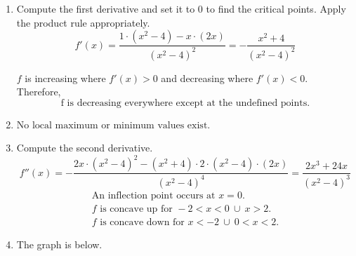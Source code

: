 \documentclass[a4paper, 12pt]{article}
\begin{document}
\begin{enumerate}[leftmargin=*,label=\textbf{\arabic*.}]
\begin{enumerate}[leftmargin=*,label=\textbf{\alph*.}]
\item Compute the first derivative and set it to $0$ to find the critical points. Apply the product rule appropriately.
\[f'(x)=\frac{1\cdot\left(x^2-4\right)-x\cdot(2x)}{\left(x^2-4\right)^2}=-\frac{x^2+4}{\left(x^2-4\right)^2}\]

$f$ is increasing where $f'(x)>0$ and decreasing where $f'(x)<0$. Therefore,
\[\boxed{\text{f is decreasing everywhere except at the undefined points.}}\]

\item $\boxed{\text{No local maximum or minimum values exist.}}$

\item Compute the second derivative.
\[f''(x)=-\frac{2x\cdot\left(x^2-4\right)^2-\left(x^2+4\right)\cdot2\cdot(x^2-4)\cdot(2x)}{\left(x^2-4\right)^4}=\frac{2x^3+24x}{\left(x^2-4\right)^3}\]
\[
\boxed{
\begin{array}{c}
\displaystyle \text{An inflection point occurs at }x=0.\\
\displaystyle f\text{ is concave up for }-2<x<0\:\cup\:x>2.\\
\displaystyle f\text{ is concave down for }x<-2\:\cup\:0<x<2.
\end{array}}
\]

\item The graph is below.
\begin{center}
\end{center}
\end{enumerate}
\end{enumerate}
\end{document}
